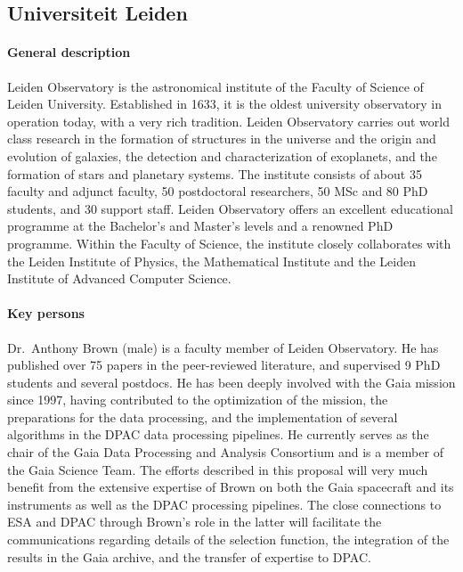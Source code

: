 \subsection{Universiteit Leiden}
\label{sec:ulei}

\paragraph{General description}
Leiden Observatory is the astronomical institute of the Faculty of Science of Leiden University. Established in 1633, it is the oldest university observatory in operation today, with a very rich tradition. Leiden Observatory carries out world class research in the formation of structures in the universe and the origin and evolution of galaxies, the detection and characterization of exoplanets, and the formation of stars and planetary systems. The institute consists of about 35 faculty and adjunct faculty, 50 postdoctoral researchers, 50 MSc and 80 PhD students, and 30 support staff. Leiden Observatory offers an excellent educational programme at the Bachelor’s and Master’s levels and a renowned PhD programme. Within the Faculty of Science, the institute closely collaborates with the Leiden Institute of Physics, the Mathematical Institute and the Leiden Institute of Advanced Computer Science.

\paragraph{Key persons}
Dr.~Anthony Brown (male) is a faculty member of Leiden Observatory. He has published over 75 papers in the peer-reviewed literature, and supervised 9 PhD students and several postdocs. He has been deeply involved with the Gaia mission since 1997, having contributed to the optimization of the mission, the preparations for the data processing, and the implementation of several algorithms in the DPAC data processing pipelines. He currently serves as the chair of the Gaia Data Processing and Analysis Consortium and is a member of the Gaia Science Team. The efforts described in this proposal will very much benefit from the extensive expertise of Brown on both the Gaia spacecraft and its instruments as well as the DPAC processing pipelines. The close connections to ESA and DPAC through Brown's role in the latter will facilitate the communications regarding details of the selection function, the integration of the results in the Gaia archive, and the transfer of expertise to DPAC.

